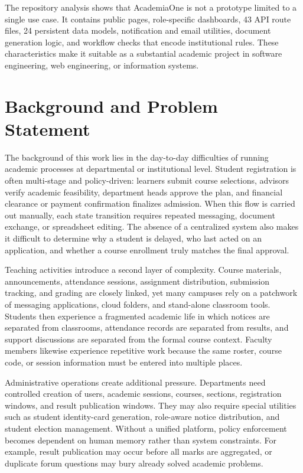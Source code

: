 \documentclass[12pt,a4paper]{report}
\newcommand{\systemName}{AcademiaOne}
\begin{document}
The repository analysis shows that \systemName{} is not a prototype limited to a single use case. It contains public pages, role-specific dashboards, 43 API route files, 24 persistent data models, notification and email utilities, document generation logic, and workflow checks that encode institutional rules. These characteristics make it suitable as a substantial academic project in software engineering, web engineering, or information systems.

\section{Background and Problem Statement}
The background of this work lies in the day-to-day difficulties of running academic processes at departmental or institutional level. Student registration is often multi-stage and policy-driven: learners submit course selections, advisors verify academic feasibility, department heads approve the plan, and financial clearance or payment confirmation finalizes admission. When this flow is carried out manually, each state transition requires repeated messaging, document exchange, or spreadsheet editing. The absence of a centralized system also makes it difficult to determine why a student is delayed, who last acted on an application, and whether a course enrollment truly matches the final approval.

Teaching activities introduce a second layer of complexity. Course materials, announcements, attendance sessions, assignment distribution, submission tracking, and grading are closely linked, yet many campuses rely on a patchwork of messaging applications, cloud folders, and stand-alone classroom tools. Students then experience a fragmented academic life in which notices are separated from classrooms, attendance records are separated from results, and support discussions are separated from the formal course context. Faculty members likewise experience repetitive work because the same roster, course code, or session information must be entered into multiple places.

Administrative operations create additional pressure. Departments need controlled creation of users, academic sessions, courses, sections, registration windows, and result publication windows. They may also require special utilities such as student identity-card generation, role-aware notice distribution, and student election management. Without a unified platform, policy enforcement becomes dependent on human memory rather than system constraints. For example, result publication may occur before all marks are aggregated, or duplicate forum questions may bury already solved academic problems.
\end{document}
